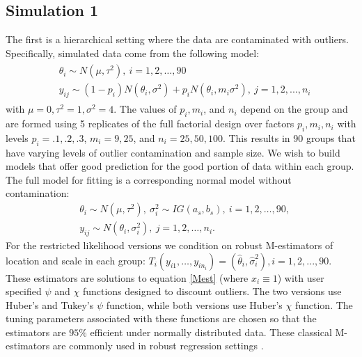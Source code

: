 \documentclass[ba]{imsart}
\begin{document}
\subsection{Simulation 1}
The first is a hierarchical setting where the data are contaminated with outliers. Specifically, simulated data come from the following model:\begin{align}
\label{gensim2}
\begin{split}
& \theta_{i}  \sim   N(\mu, \tau^{2}),  \ i = 1, 2, \dots, 90  \\ 
& y_{ij} \sim (1-p_{i})N(\theta_{i}, \sigma^{2}) + p_{i}N(\theta_{i}, m_{i}\sigma^{2}),\  j = 1, 2,..., n_{i}
\end{split}
\end{align}
with $\mu = 0, \tau^{2} = 1, \sigma^{2} = 4$. The values of $p_{i}, m_{i}$, and $n_{i}$ depend on the group and are formed using 5 replicates of the full factorial design over factors $p_{i},m_{i},n_{i}$ with levels $p_{i} = .1, .2, .3$, $m_{i} = 9, 25$, and $n_{i} = 25, 50, 100$. This results in 90 groups that have varying levels of outlier contamination and sample size. We wish to build models that offer good prediction for the good portion of data within each group. The full model for fitting is a corresponding normal model without contamination:
\begin{equation}
\label{fullsim2}
\begin{split}
& \theta_{i}\sim N(\mu, \tau^{2}), \  \sigma^{2}_{i} \sim IG(a_{s}, b_{s}),  \ i = 1, 2, \dots, 90, \\ 
& y_{ij}\sim  N(\theta_{i},\sigma^{2}_{i}), \ j = 1, 2, \dots, n_{i}.
\end{split}
\end{equation}
For the restricted likelihood versions we condition on robust M-estimators of location and scale in each group: $T_{i}(y_{i1}, \dots, y_{in_{i}}) = (\hat\theta_{i}, \hat\sigma^{2}_{i}), i = 1, 2, ..., 90$.  These estimators are solutions to equation \eqref{Mest} (where $x_{i}\equiv 1$) with user specified $\psi$ and $\chi$ functions designed to discount outliers. The two versions use Huber's and Tukey's $\psi$ function, while both versions use Huber's $\chi$ function. The tuning parameters associated with these functions are chosen so that the estimators are $95\%$ efficient under normally distributed data. These classical M-estimators are commonly used in robust regression settings  \citep{huber2009}.  %
\end{document}
